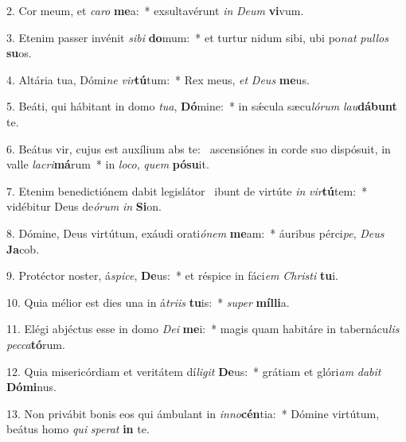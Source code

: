 2. Cor meum, et \textit{ca}\textit{ro} \textbf{me}a:~*  exsultavérunt \textit{in} \textit{De}\textit{um} \textbf{vi}vum.\

3. Etenim passer invénit \textit{si}\textit{bi} \textbf{do}mum:~*  et turtur nidum sibi, ubi po\textit{nat} \textit{pul}\textit{los} \textbf{su}os.\

4. Altária tua, Dómi\textit{ne} \textit{vir}\textbf{tú}tum:~*  Rex meus, \textit{et} \textit{De}\textit{us} \textbf{me}us.\

5. Beáti, qui hábitant in domo \textit{tu}\textit{a}, \textbf{Dó}mine:~*  in sǽcula sæcu\textit{ló}\textit{rum} \textit{lau}\textbf{dá}\textbf{bunt} te.\

6. Beátus vir, cujus est auxílium abs te: \dag\  ascensiónes in corde suo dispósuit, in valle \textit{la}\textit{cri}\textbf{má}rum~*  in \textit{lo}\textit{co}, \textit{quem} \textbf{pó}\textbf{su}it.\

7. Etenim benedictiónem dabit legislátor \dag\  ibunt de virtúte \textit{in} \textit{vir}\textbf{tú}tem:~*  vidébitur Deus de\textit{ó}\textit{rum} \textit{in} \textbf{Si}on.\

8. Dómine, Deus virtútum, exáudi orati\textit{ó}\textit{nem} \textbf{me}am:~*  áuribus pérci\textit{pe}, \textit{De}\textit{us} \textbf{Ja}cob.\

9. Protéctor noster, á\textit{spi}\textit{ce}, \textbf{De}us:~*  et réspice in fáci\textit{em} \textit{Chris}\textit{ti} \textbf{tu}i.\

10. Quia mélior est dies una in á\textit{tri}\textit{is} \textbf{tu}is:~*  \textit{su}\textit{per} \textbf{míl}\textbf{li}a.\

11. Elégi abjéctus esse in domo \textit{De}\textit{i} \textbf{me}i:~*  magis quam habitáre in tabernácu\textit{lis} \textit{pec}\textit{ca}\textbf{tó}rum.\

12. Quia misericórdiam et veritátem dí\textit{li}\textit{git} \textbf{De}us:~*  grátiam et glóri\textit{am} \textit{da}\textit{bit} \textbf{Dó}\textbf{mi}nus.\

13. Non privábit bonis eos qui ámbulant in \textit{in}\textit{no}\textbf{cén}tia:~*  Dómine virtútum, beátus homo \textit{qui} \textit{spe}\textit{rat} \textbf{in} te.\

